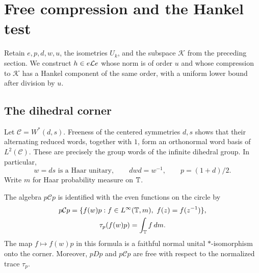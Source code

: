 \section{Free compression and the Hankel test}
\label{sec:hankel}

Retain $e,p,d,w,u$, the isometries $U_k$, and the subspace $\mathcal K$
from the preceding section. We construct $h\in e\mathcal L e$ whose norm is
of order $u$ and whose compression to $\mathcal K$ has a Hankel component
of the same order, with a uniform lower bound after division by $u$.

\subsection{The dihedral corner}

Let $\mathcal C=W^*(d,s)$. Freeness of the centered symmetries $d,s$
shows that their alternating reduced words, together with $1$, form an
orthonormal word basis of $L^2(\mathcal C)$. These are precisely the
group words of the infinite dihedral group. In particular,
\[
  w=ds\text{ is a Haar unitary},\qquad dwd=w^{-1},\qquad p=(1+d)/2.
\]
Write $m$ for Haar probability measure on $\mathbb T$.

\begin{lemma}
\label{lem:dihedral-corner}
The algebra $p\mathcal C p$ is identified with the even functions on the
circle by
\begin{equation}
  \begin{gathered}
    p\mathcal C p
      =\{f(w)p:f\in L^\infty(\mathbb T,m),\ f(z)=f(z^{-1})\},\\
    \tau_p(f(w)p)=\int_{\mathbb T}f\,dm.
  \end{gathered}
  \label{eq:dihedral-corner}
\end{equation}
The map $f\mapsto f(w)p$ in this formula is a faithful normal unital
$*$-isomorphism onto the corner. Moreover, $pDp$ and $p\mathcal C p$
are free with respect to the normalized trace $\tau_p$.
\end{lemma}

